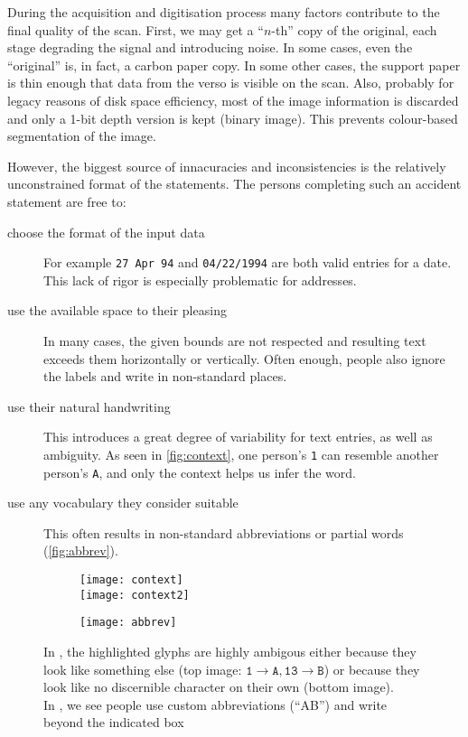 	During the acquisition and digitisation process many factors contribute to the final quality of the scan. First, we may get a ``$n$-th'' copy of the original, each stage degrading the signal and introducing noise. In some cases, even the ``original'' is, in fact, a carbon paper copy. In some other cases, the support paper is thin enough that data from the verso is visible on the scan. Also, probably for legacy reasons of disk space efficiency, most of the image information is discarded and only a 1-bit depth version is kept (binary image). This prevents colour-based segmentation of the image.

	However, the biggest source of innacuracies and inconsistencies is the relatively unconstrained format of the statements. The persons completing such an accident statement are free to:
	\begin{description}
		\item[choose the format of the input data] For example \texttt{27 Apr 94} and \texttt{04/22/1994} are both valid entries for a date. This lack of rigor is especially problematic for addresses.

		\item[use the available space to their pleasing] In many cases, the given bounds are not respected and resulting text exceeds them horizontally or vertically. Often enough, people also ignore the labels and write in non-standard places.

		\item[use their natural handwriting] \label{itm:natural_handwriting} This introduces a great degree of variability for text entries, as well as ambiguity. As seen in \autoref{fig:context}, one person's \texttt{1} can resemble another person's \texttt{A}, and only the context helps us infer the word.

		\item[use any vocabulary they consider suitable] This often results in non-standard abbreviations or partial words (\autoref{fig:abbrev}).
	\end{description}

	\begin{figure}
		\begin{subfigure}[b]{.5\linewidth}
			\centering
			\texttt{[image: context]}\\
			\texttt{[image: context2]}
			\caption{}\label{fig:context}
		\end{subfigure}
		\begin{subfigure}[b]{.48\linewidth}
			\texttt{[image: abbrev]}
			\caption{}\label{fig:abbrev}
		\end{subfigure}
		\caption[Ambiguity in handwriting]{In , the highlighted glyphs are highly ambigous either because they look like something else (top image: \(\mathtt{1} \rightarrow \mathtt{A}, \mathtt{13} \rightarrow \mathtt{B} \)) or because they look like no discernible character on their own (bottom image).\\
		In , we see people use custom abbreviations (``AB'') and write beyond the indicated box}
	\end{figure}


